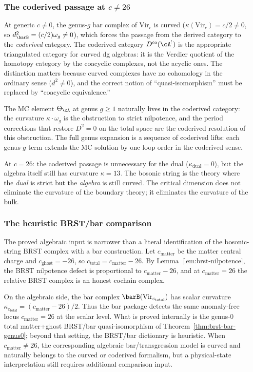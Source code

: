 \subsubsection*{The coderived passage at $c\neq 26$}

At generic $c \neq 0$, the genus-$g$ bar complex of
$\mathrm{Vir}_c$ is curved ($\kappa(\mathrm{Vir}_c) = c/2 \neq 0$,
so $d_{\barB}^2 = (c/2)\omega_g \neq 0$), which forces
the passage from the derived category to the \emph{coderived}
category. The coderived category $D^{\mathrm{co}}(\cA^!)$ is
the appropriate triangulated category for curved dg algebras:
it is the Verdier quotient of the homotopy category by the
coacyclic complexes, not the acyclic ones. The distinction
matters because curved complexes have no cohomology in the
ordinary sense ($d^2\neq 0$), and the correct notion of
``quasi-isomorphism'' must be replaced by ``coacyclic
equivalence.''

The MC element $\Theta_\cA$ at genus $g\ge 1$ naturally lives
in the coderived category: the curvature $\kappa\cdot\omega_g$
is the obstruction to strict nilpotence, and the period
corrections that restore $D^2=0$ on the total space are the
coderived resolution of this obstruction. The full genus
expansion is a sequence of coderived lifts: each genus-$g$ term
extends the MC solution by one loop order in the coderived
sense.

At $c=26$: the coderived passage is unnecessary for the dual
($\kappa_{\mathrm{dual}}=0$), but the algebra itself still has
curvature $\kappa=13$. The bosonic string is the theory
where the \emph{dual} is strict but the \emph{algebra} is
still curved. The critical dimension does not eliminate the
curvature of the boundary theory; it eliminates the curvature
of the bulk.

\subsubsection*{The heuristic BRST/bar comparison}

The proved algebraic input is narrower than a literal
identification of the bosonic-string BRST complex with a bar
construction. Let $c_{\mathrm{matter}}$ be the matter central
charge and $c_{\mathrm{ghost}}=-26$, so
$c_{\mathrm{total}}=c_{\mathrm{matter}}-26$. By
Lemma~\ref{lem:brst-nilpotence}, the BRST nilpotence defect is
proportional to $c_{\mathrm{matter}}-26$, and at
$c_{\mathrm{matter}}=26$ the relative BRST complex is an honest
cochain complex.

On the algebraic side, the bar complex
$\barB(\mathrm{Vir}_{c_{\mathrm{total}}})$ has scalar curvature
$\kappa_{c_{\mathrm{total}}}=(c_{\mathrm{matter}}-26)/2$. Thus
the bar package detects the same anomaly-free locus
$c_{\mathrm{matter}}=26$ at the scalar level. What is proved
internally is the genus-$0$ total matter+ghost BRST/bar
quasi-isomorphism of Theorem~\ref{thm:brst-bar-genus0}; beyond
that setting, the BRST/bar dictionary is heuristic. When
$c_{\mathrm{matter}}\neq 26$, the corresponding algebraic
bar/transgression model is curved and naturally belongs to the
curved or coderived formalism, but a physical-state
interpretation still requires additional comparison input.

